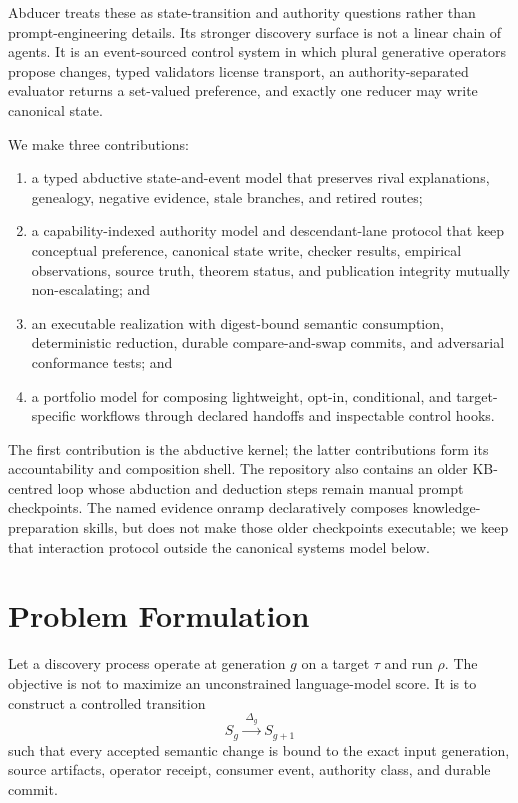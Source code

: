 \documentclass[11pt]{article}
\begin{document}
Abducer treats these as state-transition and authority questions rather than prompt-engineering details. Its stronger discovery surface is not a linear chain of agents. It is an event-sourced control system in which plural generative operators propose changes, typed validators license transport, an authority-separated evaluator returns a set-valued preference, and exactly one reducer may write canonical state.

We make three contributions:
\begin{enumerate}[leftmargin=*]
  \item a typed abductive state-and-event model that preserves rival explanations, genealogy, negative evidence, stale branches, and retired routes;
  \item a capability-indexed authority model and descendant-lane protocol that keep conceptual preference, canonical state write, checker results, empirical observations, source truth, theorem status, and publication integrity mutually non-escalating; and
  \item an executable realization with digest-bound semantic consumption, deterministic reduction, durable compare-and-swap commits, and adversarial conformance tests; and
  \item a portfolio model for composing lightweight, opt-in, conditional, and target-specific workflows through declared handoffs and inspectable control hooks.
\end{enumerate}

The first contribution is the abductive kernel; the latter contributions form its accountability and composition shell. The repository also contains an older KB-centred loop whose abduction and deduction steps remain manual prompt checkpoints. The named evidence onramp declaratively composes knowledge-preparation skills, but does not make those older checkpoints executable; we keep that interaction protocol outside the canonical systems model below.

\section{Problem Formulation}

Let a discovery process operate at generation $g$ on a target $\tau$ and run $\rho$. The objective is not to maximize an unconstrained language-model score. It is to construct a controlled transition
\[
  S_g \xrightarrow{\;\Delta_g\;} S_{g+1}
\]
such that every accepted semantic change is bound to the exact input generation, source artifacts, operator receipt, consumer event, authority class, and durable commit.
\end{document}
